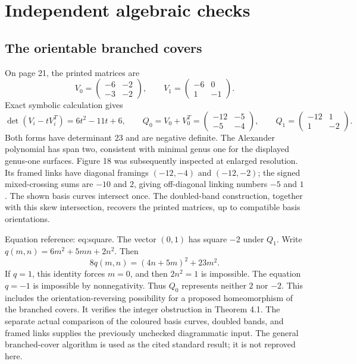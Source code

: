 \documentclass[10pt]{article}
\begin{document}
\section*{Independent algebraic checks}
\subsection*{The orientable branched covers}
On page 21, the printed matrices are \[V_0=\begin{pmatrix}-6&-2\\-3&-2\end{pmatrix},
 \qquad
 V_1=\begin{pmatrix}-6&0\\1&-1\end{pmatrix}.\] Exact symbolic calculation gives \[\det(V_i-tV_i^T)=6t^2-11t+6,\qquad
 Q_0=V_0+V_0^T=\begin{pmatrix}-12&-5\\-5&-4\end{pmatrix},
 \qquad
 Q_1=\begin{pmatrix}-12&1\\1&-2\end{pmatrix}.\] Both forms have determinant 23 and are negative definite. The Alexander polynomial has span two, consistent with minimal genus one for the displayed genus-one surfaces. Figure 18 was subsequently inspected at enlarged resolution. Its framed links have diagonal framings \((-12,-4)\) and \((-12,-2)\); the signed mixed-crossing sums are \(-10\) and \(2\), giving off-diagonal linking numbers \(-5\) and \(1\). The shown basis curves intersect once. The doubled-band construction, together with this skew intersection, recovers the printed matrices, up to compatible basis orientations.\par
Equation reference: eq:square. The vector \((0,1)\) has square \(-2\) under \(Q_1\). Write \(q(m,n)=6m^2+5mn+2n^2\). Then \[
 8q(m,n)=(4n+5m)^2+23m^2.\] If \(q=1\), this identity forces \(m=0\), and then \(2n^2=1\) is impossible. The equation \(q=-1\) is impossible by nonnegativity. Thus \(Q_0\) represents neither \(2\) nor \(-2\). This includes the orientation-reversing possibility for a proposed homeomorphism of the branched covers. It verifies the integer obstruction in Theorem 4.1. The separate actual comparison of the coloured basis curves, doubled bands, and framed links supplies the previously unchecked diagrammatic input. The general branched-cover algorithm is used as the cited standard result; it is not reproved here.\par
\end{document}

